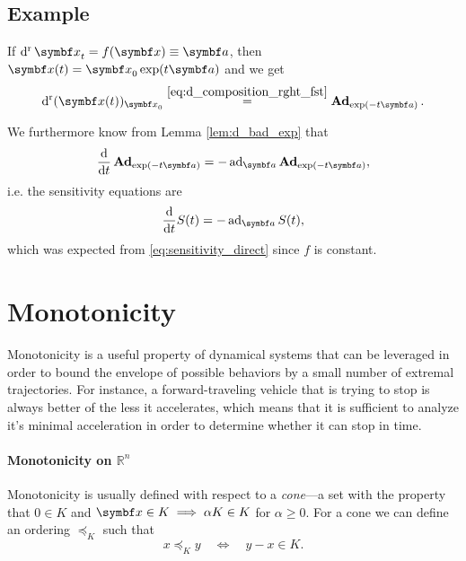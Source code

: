 \subsection{Example}

\begin{example}
  If $\dr \x_{t} = f(\x) \equiv \a$, then $\x(t) = \x_{0} \exp(t \a)$ and we get
  \begin{equation}
    \dr (\x(t))_{\x_{0}} \overset{\eqref{eq:d_composition_rght_fst}} = \bAd_{\exp(-t \a)}.
  \end{equation}

  We furthermore know from Lemma \ref{lem:d_bad_exp} that
  \begin{equation}
    \label{eq:1}
    \frac{\mathrm{d}}{\mathrm{d}t} \bAd_{\exp(-t \a)} = -\ad_{\a} \bAd_{\exp(-t \a)},
  \end{equation}
  i.e. the sensitivity equations are
  \begin{equation}
    \label{eq:13}
    \frac{\mathrm{d}}{\mathrm{d}t} S(t) = -\ad_{\a} S(t),
  \end{equation}
  which was expected from \eqref{eq:sensitivity_direct} since $f$ is constant.
\end{example}

\section{Monotonicity}


Monotonicity is a useful property of dynamical systems that can be leveraged in order to bound the envelope of possible behaviors by a small number of extremal trajectories. For instance, a forward-traveling vehicle that is trying to stop is always better of the less it accelerates, which means that it is sufficient to analyze it's minimal acceleration in order to determine whether it can stop in time.

\paragraph{Monotonicity on $\mathbb{R}^n$} Monotonicity is usually defined with respect to a \emph{cone}---a set with the property that $0 \in K$ and $\x \in K \implies \alpha K \in K$ for $\alpha \geq 0$. For a cone we can define an ordering $\preceq_K$ such that
\begin{equation}
  x \preceq_K y \quad \Longleftrightarrow \quad y - x \in K.
\end{equation}

